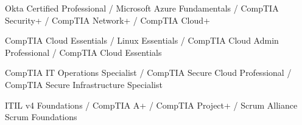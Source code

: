 
\begin{cvskills}

	\cvskill
	{}{Okta Certified Professional / Microsoft Azure Fundamentals / CompTIA Security+ / CompTIA Network+ / CompTIA Cloud+}

	\cvskill
	{}{CompTIA Cloud Essentials / Linux Essentials / CompTIA Cloud Admin Professional / CompTIA Cloud Essentials}

	\cvskill
	{}{CompTIA IT Operations Specialist / CompTIA Secure Cloud Professional / CompTIA Secure Infrastructure Specialist}

	\cvskill
	{}{ITIL v4 Foundations / CompTIA A+ / CompTIA Project+ / Scrum Alliance Scrum Foundations}

\end{cvskills}

